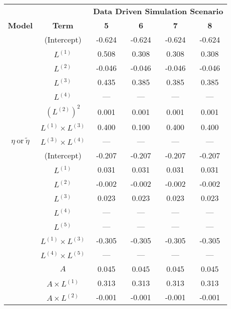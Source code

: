 \begin{table}
\begin{minipage}[t]{0.5\textwidth}
\centering

\begin{tabular}[t]{|>{}c|c|c|c|c|>{}c|}
\hline
\multicolumn{1}{|c|}{\textbf{ }} & \multicolumn{1}{|c|}{\textbf{ }} & \multicolumn{4}{|c|}{\textbf{Data Driven Simulation Scenario}} \\
\cline{3-6}
\textbf{Model} & \textbf{Term} & \textbf{5} & \textbf{6} & \textbf{7} & \textbf{8}\\
\hline
 & (Intercept) & -0.624 & -0.624 & -0.624 & -0.624\\
\cline{2-6}
 & $L^{(1)}$ & 0.508 & 0.308 & 0.308 & 0.308\\
\cline{2-6}
 & $L^{(2)}$ & -0.046 & -0.046 & -0.046 & -0.046\\
\cline{2-6}
 & $L^{(3)}$ & 0.435 & 0.385 & 0.385 & 0.385\\
\cline{2-6}
 & $L^{(4)}$ & --- & --- & --- & ---\\
\cline{2-6}
 & $(L^{(2)})^2$ & 0.001 & 0.001 & 0.001 & 0.001\\
\cline{2-6}
 & $L^{(1)} \times L^{(3)}$ & 0.400 & 0.100 & 0.400 & 0.400\\
\cline{2-6}
\multirow{-8}{*}{\centering\arraybackslash $\eta~\text{or}~\tilde\eta$} & $L^{(3)} \times L^{(4)}$ & --- & --- & --- & ---\\
\cline{1-6}
 & (Intercept) & -0.207 & -0.207 & -0.207 & -0.207\\
\cline{2-6}
 & $L^{(1)}$ & 0.031 & 0.031 & 0.031 & 0.031\\
\cline{2-6}
 & $L^{(2)}$ & -0.002 & -0.002 & -0.002 & -0.002\\
\cline{2-6}
 & $L^{(3)}$ & 0.023 & 0.023 & 0.023 & 0.023\\
\cline{2-6}
 & $L^{(4)}$ & --- & --- & --- & ---\\
\cline{2-6}
 & $L^{(5)}$ & --- & --- & --- & ---\\
\cline{2-6}
 & $L^{(1)} \times L^{(3)}$ & -0.305 & -0.305 & -0.305 & -0.305\\
\cline{2-6}
 & $L^{(4)} \times L^{(5)}$ & --- & --- & --- & ---\\
\cline{2-6}
 & $A$ & 0.045 & 0.045 & 0.045 & 0.045\\
\cline{2-6}
 & $A \times L^{(1)}$ & 0.313 & 0.313 & 0.313 & 0.313\\
\cline{2-6}
 & $A \times L^{(2)}$ & -0.001 & -0.001 & -0.001 & -0.001\\
\cline{2-6}

\end{tabular}
\end{minipage}
\end{table}

